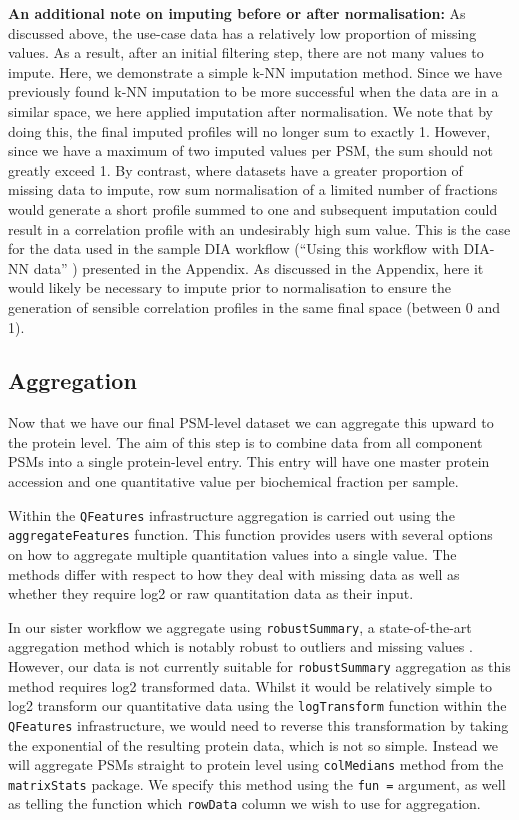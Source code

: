 \documentclass[9pt,a4paper,]{extarticle}
\begin{document}
\textbf{An additional note on imputing before or after normalisation:}
As discussed above, the use-case data has a relatively low proportion of missing
values. As a result, after an initial filtering step, there are not many
values to impute. Here, we demonstrate a simple k-NN imputation method. Since
we have previously found k-NN imputation to be more successful when the data
are in a similar space, we here applied imputation after normalisation. We note
that by doing this, the final imputed profiles will no longer sum to exactly 1.
However, since we have a maximum of two imputed values per PSM, the sum should
not greatly exceed 1. By contrast, where datasets have a greater proportion of
missing data to impute, row sum normalisation of a limited number of fractions
would generate a short profile summed to one and subsequent imputation could
result in a correlation profile with an undesirably high sum value. This is the
case for the data used in the sample DIA workflow (``Using this workflow with
DIA-NN data'' ) presented in the Appendix. As discussed in the Appendix, here it
would likely be necessary to impute prior to normalisation to ensure the
generation of sensible correlation profiles in the same final space (between 0 and 1).

\subsection{Aggregation}\label{aggregation}

Now that we have our final PSM-level dataset we can aggregate this upward to the
protein level. The aim of this step is to combine data from all component PSMs
into a single protein-level entry. This entry will have one master protein
accession and one quantitative value per biochemical fraction per sample.

Within the \texttt{QFeatures} infrastructure aggregation is carried out using the
\texttt{aggregateFeatures} function. This function provides users with several options
on how to aggregate multiple quantitation values into a single value. The methods
differ with respect to how they deal with missing data as well as whether they
require log2 or raw quantitation data as their input.

In our sister workflow \citet{Hutchings2023} we aggregate using \texttt{robustSummary}, a
state-of-the-art aggregation method which is notably robust to outliers and
missing values \citep{Sticker2020, Goeminne2016}. However, our data is not currently
suitable for \texttt{robustSummary} aggregation as this method requires log2 transformed
data. Whilst it would be relatively simple to log2 transform our quantitative
data using the \texttt{logTransform} function within the \texttt{QFeatures} infrastructure, we
would need to reverse this transformation by taking the exponential of the
resulting protein data, which is not so simple. Instead we will aggregate PSMs
straight to protein level using \texttt{colMedians} method from the \texttt{matrixStats} package.
We specify this method using the \texttt{fun\ =} argument, as well as telling the
function which \texttt{rowData} column we wish to use for aggregation.
\end{document}
